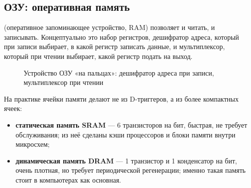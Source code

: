 \subsection{ОЗУ: оперативная память}

 (оперативное запоминающее устройство, RAM) позволяет и читать, и
записывать. Концептуально это набор регистров, дешифратор адреса, который при
записи выбирает, в какой регистр записать данные, и мультиплексор, который
при чтении выбирает, какой регистр подать на выход.

\begin{figure}[H]
\centering
{}
\caption{Устройство ОЗУ «на пальцах»: дешифратор адреса при записи,
мультиплексор при чтении}
\label{fig:ram}
\end{figure}

На практике ячейки памяти делают не из D-триггеров, а из более компактных
ячеек:
\begin{itemize}
  \item \textbf{статическая память SRAM} --- 6 транзисторов на бит, быстрая,
        не требует обслуживания; из неё сделаны кэши процессоров и блоки
        памяти внутри микросхем;
  \item \textbf{динамическая память DRAM} --- 1 транзистор и 1 конденсатор на
        бит, очень плотная, но требует периодической регенерации; именно
        такая память стоит в компьютерах как основная.
\end{itemize}

